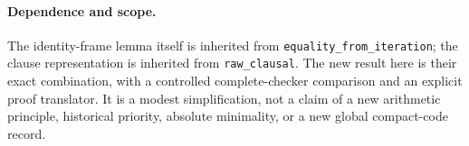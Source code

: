 \paragraph{Dependence and scope.}
The identity-frame lemma itself is inherited from
\texttt{equality\_from\_iteration}; the clause representation is inherited
from \texttt{raw\_clausal}.  The new result here is their exact combination,
with a controlled complete-checker comparison and an explicit proof
translator.  It is a modest simplification, not a claim of a new arithmetic
principle, historical priority, absolute minimality, or a new global
compact-code record.
